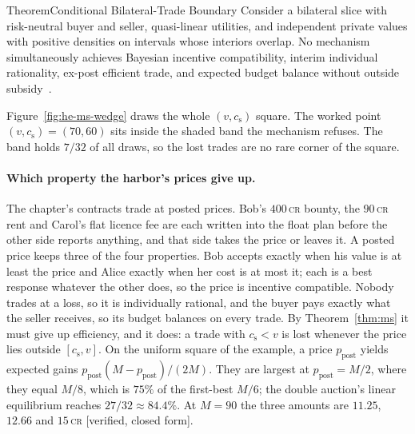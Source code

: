\documentclass[11pt,a4paper]{article}
\theoremstyle{definition}
\theoremstyle{definition}
\theoremstyle{remark}
\begin{document}
\begin{pdclaim}{Theorem}{Conditional Bilateral-Trade Boundary}
\setlength{\parskip}{4pt plus 1pt}
\label{thm:ms}
Consider a bilateral slice with risk-neutral buyer and seller, quasi-linear
utilities, and independent private values with positive densities on intervals
whose interiors overlap. No mechanism simultaneously achieves Bayesian incentive
compatibility, interim individual rationality, ex-post efficient trade, and
expected budget balance without outside subsidy~.
\end{pdclaim}



Figure~\ref{fig:he-ms-wedge} draws the whole $(v,c_{\mathrm s})$ square. The worked point
$(v,c_{\mathrm s})=(70,60)$ sits inside the shaded band the mechanism refuses. The band
holds $7/32$ of all draws, so the lost trades are no rare corner of the square.



\paragraph{Which property the harbor's prices give up.} The chapter's
contracts trade at posted prices. Bob's $400$\,\textsc{cr} bounty, the
$90$\,\textsc{cr} rent and Carol's flat licence fee are each written into the
float plan before the other side reports anything, and that side takes the
price or leaves it. A posted price keeps three of the four properties. Bob
accepts exactly when his value is at least the price and Alice exactly when
her cost is at most it; each is a best response whatever the other does, so
the price is incentive compatible. Nobody trades at a loss,
so it is individually rational, and the buyer pays exactly what the seller
receives, so its budget balances on every trade. By Theorem~\ref{thm:ms} it
must give up efficiency, and it does: a trade with $c_{\mathrm s}<v$ is lost
whenever the price lies outside $[c_{\mathrm s},v]$. On the uniform square of
the example, a price $p_{\mathrm{post}}$ yields expected gains $p_{\mathrm{post}}(M-p_{\mathrm{post}})/(2M)$.
They are largest at $p_{\mathrm{post}}=M/2$, where they equal $M/8$, which is $75\%$ of the first-best
$M/6$; the double auction's linear equilibrium reaches
$27/32\approx84.4\%$. At $M=90$ the three amounts are $11.25$, $12.66$ and
$15$\,\textsc{cr} [verified, closed form].
\end{document}
